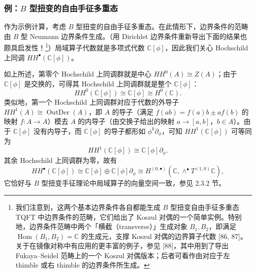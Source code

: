 \subsubsection{例：$B$ 型扭变的自由手征多重态}
作为示例计算，考虑 $B$ 型扭变的自由手征多重态。在此情形下，边界条件的范畴由 $B$ 型 Neumann 边界条件生成。（用 Dirichlet 边界条件重新导出下面的结果也颇具启发性！\footnote{我们注意到，这两个基本边界条件各自都能生成 $B$ 型扭变自由手征多重态 TQFT 中边界条件的范畴，它们给出了 Koszul 对偶的一个简单实例。特别地，边界条件范畴中两个「横截（transverse）」生成对象 $B_1,B_2$，即满足 $\operatorname{Hom}(B_1,B_2)=\mathbb{C}$ 的生成元，支撑 Koszul 对偶的边界算子代数 [86, 87]。关于在镜像对称中有应用的更丰富的例子，参见 [88]，其中用到了导出 Fukaya–Seidel 范畴上的一个 Koszul 对偶版本；后者可看作由对应于左 thimble 或右 thimble 的边界条件所生成。}）局域算子代数就是多项式代数 $\mathbb{C}[\phi]$，因此我们关心 Hochschild 上同调 $HH^\bullet(\mathbb{C}[\phi])$。

如上所述，第零个 Hochschild 上同调群就是中心 $HH^0(A)\cong Z(A)$；由于 $\mathbb{C}[\phi]$ 是交换的，可得其 Hochschild 上同调群就是整个 $\mathbb{C}[\phi]$：
\begin{equation}
  \tag{3.50}
  HH^0(\mathbb{C}[\phi])\cong\mathbb{C}[\phi]\cong H^0(\mathbb{C}).
\end{equation}
类似地，第一个 Hochschild 上同调群对应于代数的外导子 $HH^1(A)\cong\operatorname{OutDer}(A)$，即 $A$ 的导子（满足 $f(ab)=f(a)b\pm af(b)$ 的映射 $f:A\to A$）模去 $A$ 的内导子（由交换子给出的映射 $a\to[a,b]$，$b\in A$）。由于 $\mathbb{C}[\phi]$ 没有内导子，而 $\mathbb{C}[\phi]$ 的导子都形如 $\phi^k\partial_\phi$，可知 $HH^1(\mathbb{C}[\phi])$ 可等同为
\begin{equation}
  \tag{3.51}
  HH^1(\mathbb{C}[\phi])\cong\mathbb{C}[\phi]\partial_\phi.
\end{equation}
其余 Hochschild 上同调群为零，故有
\begin{equation}
  \tag{3.52}
  HH^\bullet(\mathbb{C}[\phi])\cong\mathbb{C}[\phi]\oplus\mathbb{C}[\phi]\partial_\phi\cong H^{(0,\bullet)}(\mathbb{C},\wedge^\bullet T^{(1,0)}\mathbb{C}),
\end{equation}
它恰好与 $B$ 型扭变手征理论中局域算子的向量空间一致，参见 2.3.2 节。

